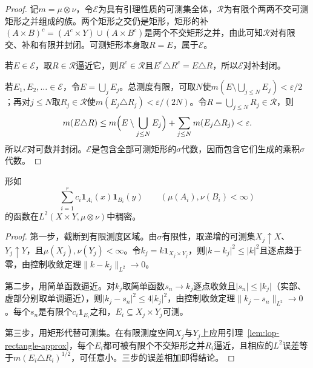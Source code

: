 \begin{proof}
记$m=\mu\otimes\nu$，令$\mathcal E$为具有引理性质的可测集全体，$\mathcal R$为有限个两两不交可测矩形之并组成的族。两个矩形之交仍是矩形，矩形的补$(A\times B)^c=(A^c\times Y)\cup(A\times B^c)$是两个不交矩形之并，由此可知$\mathcal R$对有限交、补和有限并封闭。可测矩形本身取$R=E$，属于$\mathcal E$。

若$E\in\mathcal E$，取$R\in\mathcal R$逼近它，则$R^c\in\mathcal R$且$E^c\triangle R^c=E\triangle R$，所以$\mathcal E$对补封闭。

若$E_1,E_2,\ldots\in\mathcal E$，令$E=\bigcup_jE_j$。总测度有限，可取$N$使$m(E\setminus\bigcup_{j\leq N}E_j)<\varepsilon/2$；再对$j\leq N$取$R_j\in\mathcal R$使$m(E_j\triangle R_j)<\varepsilon/(2N)$。令$R=\bigcup_{j\leq N}R_j\in\mathcal R$，则
\[
 m(E\triangle R)\leq m\Bigl(E\setminus\bigcup_{j\leq N}E_j\Bigr)+\sum_{j\leq N}m(E_j\triangle R_j)<\varepsilon .
\]
所以$\mathcal E$对可数并封闭。$\mathcal E$是包含全部可测矩形的$\sigma$代数，因而包含它们生成的乘积$\sigma$代数。
\end{proof}

\begin{theorem}[矩形阶梯核的稠密性]
\label{thm:lop-rectangle-dense}
形如
\begin{equation}
 \sum_{i=1}^rc_i\mathbf 1_{A_i}(x)\mathbf 1_{B_i}(y)\qquad(\mu(A_i),\nu(B_i)<\infty)
 \label{eq:lop-rectangle-kernel}
\end{equation}
的函数在$L^2(X\times Y,\mu\otimes\nu)$中稠密。
\end{theorem}

\begin{proof}
第一步，截断到有限测度区域。由$\sigma$有限性，取递增的可测集$X_j\uparrow X$、$Y_j\uparrow Y$，且$\mu(X_j),\nu(Y_j)<\infty$。令$k_j=k\mathbf 1_{X_j\times Y_j}$，则$\lvert k-k_j\rvert^2\leq\lvert k\rvert^2$且逐点趋于零，由控制收敛定理$\lVert k-k_j\rVert_{L^2}\to0$。

第二步，用简单函数逼近。对$k_j$取简单函数$s_n\to k_j$逐点收敛且$\lvert s_n\rvert\leq\lvert k_j\rvert$（实部、虚部分别取单调逼近），则$\lvert k_j-s_n\rvert^2\leq4\lvert k_j\rvert^2$，由控制收敛定理$\lVert k_j-s_n\rVert_{L^2}\to0$。每个$s_n$是有限个$c_i\mathbf 1_{E_i}$之和，$E_i\subseteq X_j\times Y_j$可测。

第三步，用矩形代替可测集。在有限测度空间$X_j$与$Y_j$上应用引理~\ref{lem:lop-rectangle-approx}，每个$E_i$都可被有限个不交矩形之并$R_i$逼近，且相应的$L^2$误差等于$m(E_i\triangle R_i)^{1/2}$，可任意小。三步的误差相加即得结论。
\end{proof}

